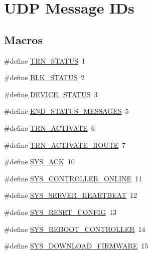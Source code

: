 \hypertarget{group___u_d_p_message_i_d}{}\section{U\+DP Message I\+Ds}
\label{group___u_d_p_message_i_d}
\subsection*{Macros}
\begin{DoxyCompactItemize}
\item 
\#define \hyperlink{group___u_d_p_message_i_d_gacf1beacf20d9d977b8a27878039d43d7}{T\+R\+N\+\_\+\+S\+T\+A\+T\+US}~1
\item 
\#define \hyperlink{group___u_d_p_message_i_d_gaf8a3426c6f740f351255d50cdda3c9f8}{B\+L\+K\+\_\+\+S\+T\+A\+T\+US}~2
\item 
\#define \hyperlink{group___u_d_p_message_i_d_ga88466ee7861a482c0ebdd16171184747}{D\+E\+V\+I\+C\+E\+\_\+\+S\+T\+A\+T\+US}~3
\item 
\#define \hyperlink{group___u_d_p_message_i_d_gab92fe1aa1c17f0c4e37cf31e79fb1419}{E\+N\+D\+\_\+\+S\+T\+A\+T\+U\+S\+\_\+\+M\+E\+S\+S\+A\+G\+ES}~5
\item 
\#define \hyperlink{group___u_d_p_message_i_d_gab5a0eacfbf0cfab134534d10890d5c25}{T\+R\+N\+\_\+\+A\+C\+T\+I\+V\+A\+TE}~6
\item 
\#define \hyperlink{group___u_d_p_message_i_d_ga44d53121d88631ed14d77f8b6a405816}{T\+R\+N\+\_\+\+A\+C\+T\+I\+V\+A\+T\+E\+\_\+\+R\+O\+U\+TE}~7
\item 
\#define \hyperlink{group___u_d_p_message_i_d_gaf3b0535ed1fed9f9dfb92b18ff78956c}{S\+Y\+S\+\_\+\+A\+CK}~10
\item 
\#define \hyperlink{group___u_d_p_message_i_d_ga23aab89076591390a1dbc412a3a07314}{S\+Y\+S\+\_\+\+C\+O\+N\+T\+R\+O\+L\+L\+E\+R\+\_\+\+O\+N\+L\+I\+NE}~11
\item 
\#define \hyperlink{group___u_d_p_message_i_d_gaddd0be32c40eb5aa6ff7247ec41d402d}{S\+Y\+S\+\_\+\+S\+E\+R\+V\+E\+R\+\_\+\+H\+E\+A\+R\+T\+B\+E\+AT}~12
\item 
\#define \hyperlink{group___u_d_p_message_i_d_ga30863a10d0fcf12b2664d572864c4e0f}{S\+Y\+S\+\_\+\+R\+E\+S\+E\+T\+\_\+\+C\+O\+N\+F\+IG}~13
\item 
\#define \hyperlink{group___u_d_p_message_i_d_gae5a140537bdeb16c6f8ac38ee7a841f6}{S\+Y\+S\+\_\+\+R\+E\+B\+O\+O\+T\+\_\+\+C\+O\+N\+T\+R\+O\+L\+L\+ER}~14
\item 
\#define \hyperlink{group___u_d_p_message_i_d_ga88b6f619a28320e9136847e9b1b27a36}{S\+Y\+S\+\_\+\+D\+O\+W\+N\+L\+O\+A\+D\+\_\+\+F\+I\+R\+M\+W\+A\+RE}~15

\end{DoxyCompactItemize}
